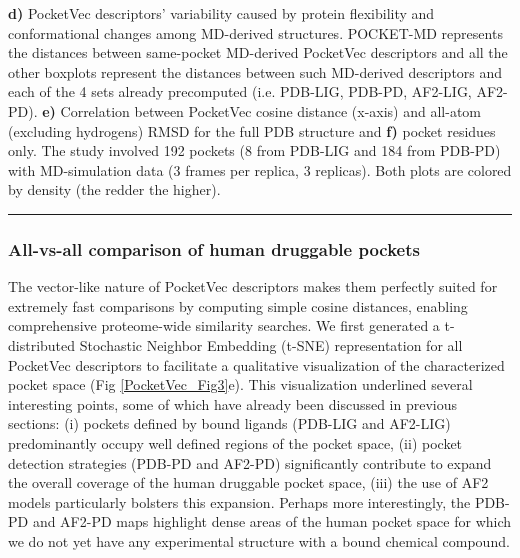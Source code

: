 \begin{Figure_modified}
{    \textbf{d)} PocketVec descriptors’ variability caused by protein flexibility and conformational changes among MD-derived structures. POCKET-MD represents the distances between same-pocket MD-derived PocketVec descriptors and all the other boxplots represent the distances between such MD-derived descriptors and each of the 4 sets already precomputed (i.e. PDB-LIG, PDB-PD, AF2-LIG, AF2-PD).
    \textbf{e)} Correlation between PocketVec cosine distance (x-axis) and all-atom (excluding hydrogens) RMSD for the full PDB structure and
    \textbf{f)} pocket residues only. The study involved 192 pockets (8 from PDB-LIG and 184 from PDB-PD) with MD-simulation data (3 frames per replica, 3 replicas). Both plots are colored by density (the redder the higher).
  }
  \vspace{-5mm}
  \rule[0ex]{\textwidth}{0.5pt}
  \vspace{-9mm}
  \label{PocketVec_Fig4}
\end{Figure_modified}



\subsubsection{All-vs-all comparison of human druggable pockets}
\label{PocketVec_ResultsAndDiscussion_All_vs_All_comparison_human_druggable_pockets}

The vector-like nature of PocketVec descriptors makes them perfectly suited for extremely fast comparisons by computing simple cosine distances, enabling comprehensive proteome-wide similarity searches. We first generated a t-distributed Stochastic Neighbor Embedding (t-SNE) representation for all PocketVec descriptors to facilitate a qualitative visualization of the characterized pocket space (Fig \ref{PocketVec_Fig3}e). This visualization underlined several interesting points, some of which have already been discussed in previous sections: (i) pockets defined by bound ligands (PDB-LIG and AF2-LIG) predominantly occupy well defined regions of the pocket space, (ii) pocket detection strategies (PDB-PD and AF2-PD) significantly contribute to expand the overall coverage of the human druggable pocket space, (iii) the use of AF2 models particularly bolsters this expansion. Perhaps more interestingly, the PDB-PD and AF2-PD maps highlight dense areas of the human pocket space for which we do not yet have any experimental structure with a bound chemical compound.

